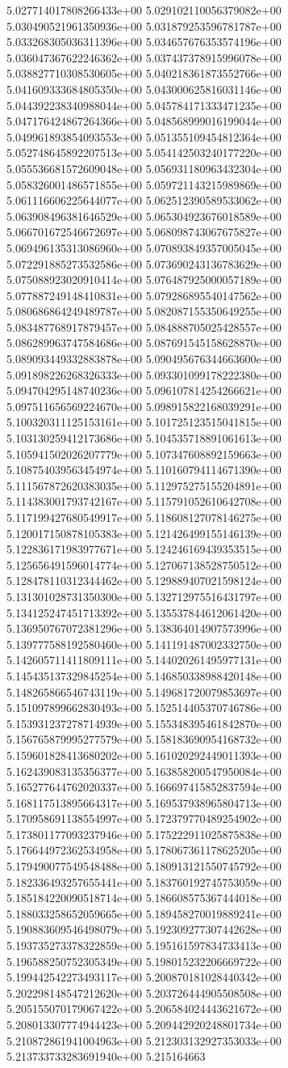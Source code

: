 5.027714017808266433e+00	5.029102110056379082e+00	5.030490521961350936e+00	5.031879253596781787e+00	5.033268305036311396e+00	5.034657676353574196e+00	5.036047367622246362e+00	5.037437378915996078e+00	5.038827710308530605e+00	5.040218361873552766e+00	5.041609333684805350e+00	5.043000625816031146e+00	5.044392238340988044e+00	5.045784171333471235e+00	5.047176424867264366e+00	5.048568999016199044e+00	5.049961893854093553e+00	5.051355109454812364e+00	5.052748645892207513e+00	5.054142503240177220e+00	5.055536681572609048e+00	5.056931180963432304e+00	5.058326001486571855e+00	5.059721143215989869e+00	5.061116606225644077e+00	5.062512390589533062e+00	5.063908496381646529e+00	5.065304923676018589e+00	5.066701672546672697e+00	5.068098743067675827e+00	5.069496135313086960e+00	5.070893849357005045e+00	5.072291885273532586e+00	5.073690243136783629e+00	5.075088923020910414e+00	5.076487925000057189e+00	5.077887249148410831e+00	5.079286895540147562e+00	5.080686864249489787e+00	5.082087155350649255e+00	5.083487768917879457e+00	5.084888705025428557e+00	5.086289963747584686e+00	5.087691545158628870e+00	5.089093449332883878e+00	5.090495676344663600e+00	5.091898226268326333e+00	5.093301099178222380e+00	5.094704295148740236e+00	5.096107814254266621e+00	5.097511656569224670e+00	5.098915822168039291e+00	5.100320311125153161e+00	5.101725123515041815e+00	5.103130259412173686e+00	5.104535718891061613e+00	5.105941502026207779e+00	5.107347608892159663e+00	5.108754039563454974e+00	5.110160794114671390e+00	5.111567872620383035e+00	5.112975275155204891e+00	5.114383001793742167e+00	5.115791052610642708e+00	5.117199427680549917e+00	5.118608127078146275e+00	5.120017150878105383e+00	5.121426499155146139e+00	5.122836171983977671e+00	5.124246169439353515e+00	5.125656491596014774e+00	5.127067138528750512e+00	5.128478110312344462e+00	5.129889407021598124e+00	5.131301028731350300e+00	5.132712975516431797e+00	5.134125247451713392e+00	5.135537844612061420e+00	5.136950767072381296e+00	5.138364014907573996e+00	5.139777588192580460e+00	5.141191487002332750e+00	5.142605711411809111e+00	5.144020261495977131e+00	5.145435137329845254e+00	5.146850338988420148e+00	5.148265866546743119e+00	5.149681720079853697e+00	5.151097899662830493e+00	5.152514405370746786e+00	5.153931237278714939e+00	5.155348395461842870e+00	5.156765879995277579e+00	5.158183690954168732e+00	5.159601828413680202e+00	5.161020292449011393e+00	5.162439083135356377e+00	5.163858200547950084e+00	5.165277644762020337e+00	5.166697415852837594e+00	5.168117513895664317e+00	5.169537938965804713e+00	5.170958691138554997e+00	5.172379770489254902e+00	5.173801177093237946e+00	5.175222911025875838e+00	5.176644972362534958e+00	5.178067361178625205e+00	5.179490077549548488e+00	5.180913121550745792e+00	5.182336493257655441e+00	5.183760192745753059e+00	5.185184220090518714e+00	5.186608575367444018e+00	5.188033258652059665e+00	5.189458270019889241e+00	5.190883609546498079e+00	5.192309277307442628e+00	5.193735273378322859e+00	5.195161597834733413e+00	5.196588250752305349e+00	5.198015232206669722e+00	5.199442542273493117e+00	5.200870181028440342e+00	5.202298148547212620e+00	5.203726444905508508e+00	5.205155070179067422e+00	5.206584024443621672e+00	5.208013307774944423e+00	5.209442920248801734e+00	5.210872861941004963e+00	5.212303132927353033e+00	5.213733733283691940e+00	5.215164663